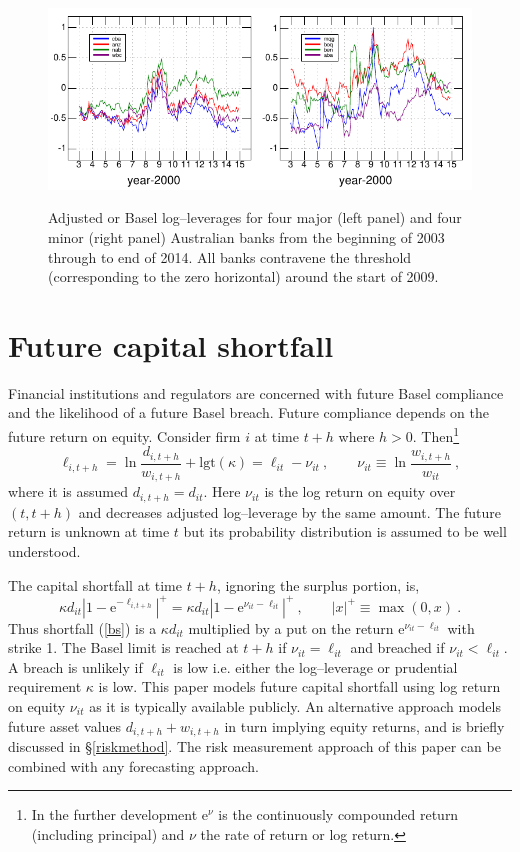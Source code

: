 \documentclass[12pt]{article}
\newcommand{\logit}{\mathrm{lgt}}
\newcommand{\e}{\mathrm{e}}
\newcommand{\eref}[1]{(\ref{#1})}
\newcommand{\sref}[1]{\S\ref{#1}}
\newcommand{\cq}{\ , \qquad}
\newcommand{\be}[1]{\begin{equation}\label{#1}}
\newcommand{\ee}{\end{equation}}
\begin{document}
\begin{figure}[htbp]
\begin{center}
\label{Bloglev}
\includegraphics{figures/bloglev.pdf}
\caption{Adjusted or Basel log--leverages for four major (left panel) and four minor (right panel) Australian banks from the beginning of 2003 through to end of 2014.  All banks contravene the threshold (corresponding to the zero horizontal) around the start of 2009.}
\end{center}
\end{figure}


\section{Future capital shortfall}\label{futshort}

Financial institutions and regulators are concerned with future Basel compliance and the likelihood of a  future Basel breach.   Future compliance depends on the future return on equity.   Consider  firm $i$ at time  $t+h$ where $h>0$.  Then\footnote{In the further development $\e^\nu$ is the continuously compounded return (including principal) and $\nu$  the  rate of return or log return.}
$$
\ell_{i,t+h} = \ln \frac{d_{i,t+h}}{w_{i,t+h}} +\logit(\kappa)= \ell_{it} -\nu_{it}\cq \nu_{it}\equiv \ln\frac{w_{i,t+h}}{w_{it}}  \ ,
$$
where it is assumed $d_{i,t+h}=d_{it}$.  Here $\nu_{it}$ is the log return on equity over $(t,t+h)$ and decreases adjusted log--leverage by the same amount.  The future return is unknown at time $t$ but its probability distribution is assumed to be well understood.

The capital  shortfall  at time $t+h$, ignoring the surplus portion, is,
\be{bs}
\kappa d_{it} \left|1-\e^{-\ell_{i,t+h}}\right|^+=\kappa d_{it} \left|1-\e^{\nu_{it}-\ell_{it}}\right|^+
\cq  |x|^+\equiv \max(0,x)\ .
\ee
Thus shortfall \eref{bs} is a $\kappa d_{it}$ multiplied by a put on the return $\e^{\nu_{it}-\ell_{it}}$  with strike 1.
The Basel  limit is reached at $t+h$ if $\nu_{it}=\ell_{it}$ and  breached  if
$\nu_{it}< \ell_{it}$.
A breach is  unlikely if $\ell_{it}$ is low i.e. either the log--leverage or prudential requirement $\kappa$ is low. This paper models future capital shortfall using log return on equity $\nu_{it}$ as it is typically available publicly. An alternative approach models future asset values $d_{i,t+h}+w_{i,t+h}$ in turn implying equity returns, and is briefly discussed in \sref{riskmethod}. The risk measurement approach of this paper can be combined with any forecasting approach.
\end{document}

